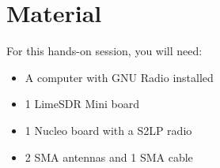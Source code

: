 \section*{Material}

\begin{comment}[couleur = gray!20, arrondi = 0.2, logo=\bcinfo]{}
\vspace{0.2cm}
\end{comment}
For this hands-on session, you will need:
\begin{itemize}
    \item A computer with GNU Radio installed
    \item 1 LimeSDR Mini board
    \item 1 Nucleo board with a S2LP radio
    \item 2 SMA antennas and 1 SMA cable
\end{itemize}
